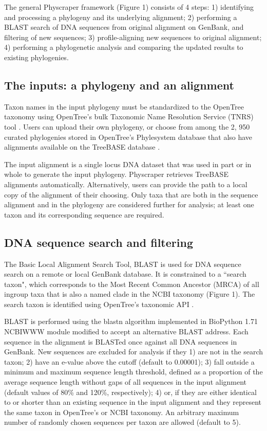 \documentclass{bmcart}
\begin{document}
The general Physcraper framework (Figure 1) consists of 4 steps: 1) identifying and
processing a phylogeny and its underlying alignment; 2) performing a BLAST search of
DNA sequences from original alignment on GenBank, and filtering of new sequences;
3) profile-aligning new sequences to original alignment; 4) performing a phylogenetic
analysis and comparing the updated results to existing phylogenies.


\subsection*{The inputs: a phylogeny and an alignment}

Taxon names in the input phylogeny must be standardized to the OpenTree taxonomy
\cite{ott3.2} using OpenTree's bulk Taxonomic Name Resolution Service
(TNRS) tool \cite{TNRStool}. Users can upload their
own phylogeny, or choose from among the 2, 950 curated phylogenies stored in OpenTree's
Phylesystem database \cite{phylesystemGithub} that also have
alignments available on the TreeBASE database \cite{treebase_website, supertreebase}.

The input alignment is a single locus DNA dataset that was used in part or in
whole to generate the input phylogeny. Physcraper retrieves TreeBASE alignments
automatically. Alternatively, users can provide the path to a local copy of the
alignment of their choosing.
Only taxa that are both in the sequence alignment and in the phylogeny are considered
further for analysis; at least one taxon and its corresponding sequence are required.

\subsection*{DNA sequence search and filtering}

The Basic Local Alignment Search Tool, BLAST \cite{altschul1990basic} is used for DNA
sequence search on a remote or local GenBank database. It is constrained to a
 ``search taxon", which corresponds to the Most Recent Common Ancestor (MRCA) of
all ingroup taxa that is also a named clade in the NCBI taxonomy (Figure 1). The
search taxon is identified using OpenTree's taxonomic API \cite{mrcaAPI}.

BLAST is performed using the blastn algorithm \cite{camacho2009blast}
implemented in BioPython 1.71 \cite{cock2009biopython} NCBIWWW module \cite{ncbiwww}
modified to accept an alternative BLAST address.
Each sequence in the alignment is BLASTed once against all DNA sequences in GenBank.
New sequences are excluded for analysis if they 1) are not in the search taxon;
2) have an e-value above the cutoff (default to 0.00001); 3) fall outside a minimum
and maximum sequence length threshold, defined as a proportion of the average sequence length without
gaps of all sequences in the input alignment (default values of 80\% and 120\%,
respectively); 4) or, if they are either identical to or shorter than an existing
sequence in the input alignment and they represent the same taxon in OpenTree's or
NCBI taxonomy.
An arbitrary maximum number of randomly chosen sequences per taxon are allowed
(default to 5).
\end{document}
